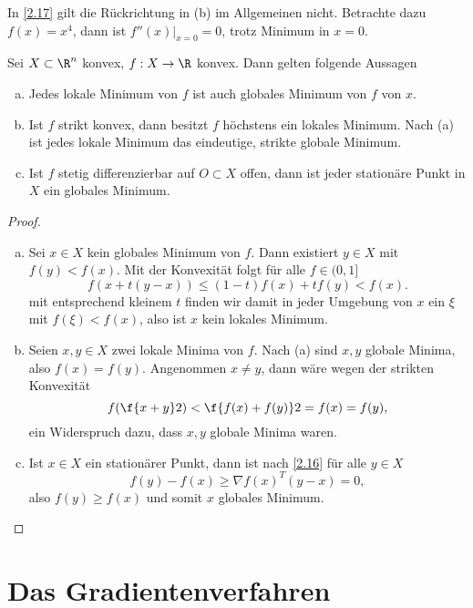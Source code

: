 \begin{ex} \label{2.18}
	In \ref{2.17} gilt die Rückrichtung in (b) im Allgemeinen nicht.
	Betrachte dazu $f(x) = x^4$, dann ist $f''(x)\big|_{x=0} = 0$, trotz Minimum in $x=0$.
\end{ex}


\begin{st} \label{2.19}
	Sei $X \subset \R^n$ konvex, $f: X \to \R$ konvex.
	Dann gelten folgende Aussagen
	\begin{enumerate}[(a)]
		\item
			Jedes lokale Minimum von $f$ ist auch globales Minimum von $f$ von $x$.
		\item
			Ist $f$ strikt konvex, dann besitzt $f$ höchstens ein lokales Minimum.
			Nach (a) ist jedes lokale Minimum das eindeutige, strikte globale Minimum.
		\item
			Ist $f$ stetig differenzierbar auf $O \subset X$ offen, dann ist jeder stationäre Punkt in $X$ ein globales Minimum.
	\end{enumerate}
	\begin{proof}
		\begin{enumerate}[(a)]
			\item
				Sei $x \in X$ kein globales Minimum von $f$.
				Dann existiert $y \in X$ mit $f(y) < f(x)$.
				Mit der Konvexität folgt für alle $f \in (0,1]$
				\[
					f(x+t(y-x))
					\le (1-t)f(x) + t f(y)
					< f(x).
				\]
				mit entsprechend kleinem $t$ finden wir damit in jeder Umgebung von $x$ ein $\xi$ mit $f(\xi) < f(x)$, also ist $x$ kein lokales Minimum.
			\item
				Seien $x,y \in X$ zwei lokale Minima von $f$.
				Nach (a) sind $x,y$ globale Minima, also $f(x) = f(y)$.
				Angenommen $x \neq y$, dann wäre wegen der strikten Konvexität
				\[
					f(\f {x+y}2)
					< \f{f(x) + f(y)}2
					= f(x)
					= f(y),
				\]
				ein Widerspruch dazu, dass $x,y$ globale Minima waren.
			\item
				Ist $x \in X$ ein stationärer Punkt, dann ist nach \ref{2.16} für alle $y\in X$
				\[
					f(y) - f(x)
					\ge \nabla f(x)^T (y-x)
					= 0,
				\]
				also $f(y) \ge f(x)$ und somit $x$ globales Minimum.
		\end{enumerate}
	\end{proof}
\end{st}


\section{Das Gradientenverfahren}


